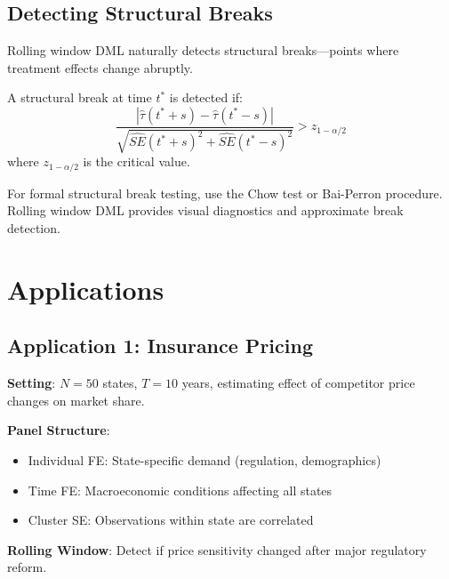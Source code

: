 \subsection{Detecting Structural Breaks}

Rolling window DML naturally detects structural breaks---points where treatment effects change abruptly.

\begin{definition}
\label{def:structural_break}
A structural break at time $t^*$ is detected if:
\begin{equation}
\frac{|\hat{\tau}(t^* + s) - \hat{\tau}(t^* - s)|}{\sqrt{\widehat{SE}(t^*+s)^2 + \widehat{SE}(t^*-s)^2}} > z_{1-\alpha/2}
\end{equation}
where $z_{1-\alpha/2}$ is the critical value.
\end{definition}

\begin{remark}
For formal structural break testing, use the Chow test or Bai-Perron procedure. Rolling window DML provides visual diagnostics and approximate break detection.
\end{remark}

\section{Applications}\label{sec:applications}

\subsection{Application 1: Insurance Pricing}

\textbf{Setting}: $N = 50$ states, $T = 10$ years, estimating effect of competitor price changes on market share.

\textbf{Panel Structure}:
\begin{itemize}
    \item Individual FE: State-specific demand (regulation, demographics)
    \item Time FE: Macroeconomic conditions affecting all states
    \item Cluster SE: Observations within state are correlated
\end{itemize}

\textbf{Rolling Window}: Detect if price sensitivity changed after major regulatory reform.

